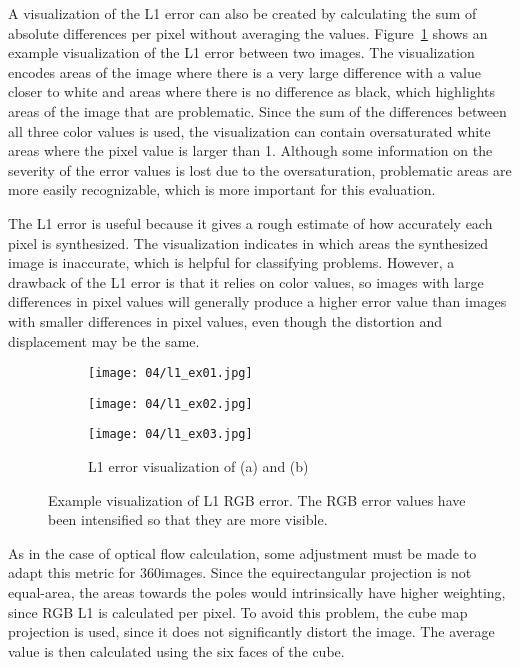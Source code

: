 A visualization of the L1 error can also be created by calculating the sum of absolute differences per pixel without averaging the values. Figure~\ref{fig:l1_example} shows an example visualization of the L1 error between two images. The visualization encodes areas of the image where there is a very large difference with a value closer to white and areas where there is no difference as black, which highlights areas of the image that are problematic. Since the sum of the differences between all three color values is used, the visualization can contain oversaturated white areas where the pixel value is larger than 1. Although some information on the severity of the error values is lost due to the oversaturation, problematic areas are more easily recognizable, which is more important for this evaluation.

The L1 error is useful because it gives a rough estimate of how accurately each pixel is synthesized. The visualization indicates in which areas the synthesized image is inaccurate, which is helpful for classifying problems. However, a drawback of the L1 error is that it relies on color values, so images with large differences in pixel values will generally produce a higher error value than images with smaller differences in pixel values, even though the distortion and displacement may be the same.

\begin{figure}
\centering
    \hfill
    \begin{subfigure}[t]{0.3\textwidth}
            \centering
            \texttt{[image: 04/l1\_ex01.jpg]}
            \caption{}
    \end{subfigure}%
    \hfill
    \begin{subfigure}[t]{0.3\textwidth}
            \centering
            \texttt{[image: 04/l1\_ex02.jpg]}
            \caption{}
    \end{subfigure}
    \hfill
    \begin{subfigure}[t]{0.3\textwidth}
            \centering
            \texttt{[image: 04/l1\_ex03.jpg]}
            \caption{L1 error visualization of (a) and (b)}
    \end{subfigure}%
    \hfill
    \hfill
  \caption[Example visualization of L1 RGB error]{Example visualization of L1 RGB error. The RGB error values have been intensified so that they are more visible.} \label{fig:l1_example}
\end{figure}

As in the case of optical flow calculation, some adjustment must be made to adapt this metric for 360\degree images. Since the equirectangular projection is not equal-area, the areas towards the poles would intrinsically have higher weighting, since RGB L1 is calculated per pixel. To avoid this problem, the cube map projection is used, since it does not significantly distort the image. The average value is then calculated using the six faces of the cube.

